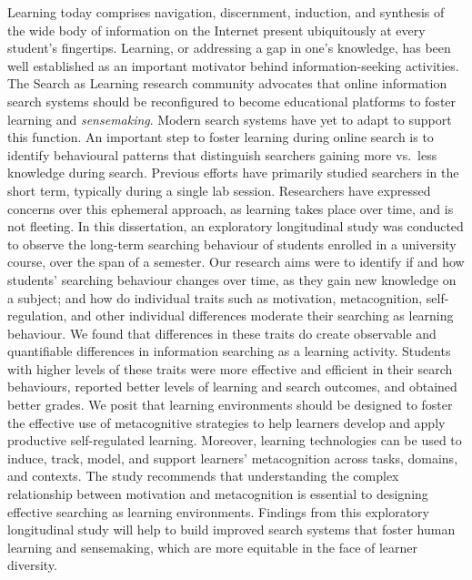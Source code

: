 \documentclass[letterpaper, nobind]{templates/ociamthesis}
\begin{document}
\begin{romanpages}
\begin{spacing}{1.5}
  \indent
  Learning today comprises navigation, discernment, induction, and synthesis of the wide body of information on the Internet present ubiquitously at every student's fingertips.
  Learning, or addressing a gap in one's knowledge, has been well established as an important motivator behind information-seeking activities.
  The Search as Learning research community advocates that online information search systems should be reconfigured to become educational platforms to foster learning and \emph{sensemaking}.
  Modern search systems have yet to adapt to support this function.
  An important step to foster learning during online search is to identify behavioural patterns that distinguish searchers gaining more vs.~less knowledge during search.
  Previous efforts have primarily studied searchers in the short term, typically during a single lab session.
  Researchers have expressed concerns over this ephemeral approach, as learning takes place over time, and is not fleeting.
  In this dissertation, an exploratory longitudinal study was conducted to observe the long-term searching behaviour of students enrolled in a university course, over the span of a semester.
  Our research aims were to identify if and how students' searching behaviour changes over time, as they gain new knowledge on a subject; and how do individual traits such as motivation, metacognition, self-regulation, and other individual differences moderate their searching as learning behaviour.
  We found that differences in these traits do create observable and quantifiable differences in information searching as a learning activity.
  Students with higher levels of these traits were more effective and efficient in their search behaviours, reported better levels of learning and search outcomes, and obtained better grades.
  We posit that learning environments should be designed to foster the effective use of metacognitive strategies to help learners develop and apply productive self-regulated learning.
  Moreover, learning technologies can be used to induce, track, model, and support learners' metacognition across tasks, domains, and contexts.
  The study recommends that understanding the complex relationship between motivation and metacognition is essential to designing effective searching as learning environments.
  Findings from this exploratory longitudinal study will help to build improved search systems that foster human learning and sensemaking, which are more equitable in the face of learner diversity.
\end{spacing}


\end{romanpages}
\end{document}
